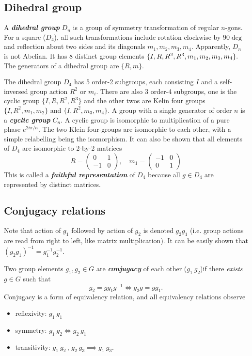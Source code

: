 \documentclass{article}
\begin{document}
\subsection{Dihedral group}
A \textit{\textbf{dihedral group}} $D_n$ is a group of symmetry transformation of regular $n$-gons. For a square ($D_4$), all such transformations include rotation clockwise by $90\deg$ and reflection about two sides and its diagonals $m_1, m_2, m_3, m_4.$ Apparently, $D_n$ is not Abelian. It has $8$ distinct group elements $\{I,R,R^{2}, R^3,  m_1, m_2, \newline m_3, m_4\}.$ The generators of a dihedral group are $\{R, m\}.$ 

The dihedral group $D_4$ has 5 order-2 subgroups, each consisting $I$ and a self-inversed group action $R^2$ or $m_i.$ There are also 3 order-4 subgroups, one is the cyclic group $\{I, R, R^2, R^3\}$ and the other twos are Kelin four groups $\{I, R^2, m_1, m_2\}$ and $\{I, R^2, m_3, m_4\}.$
A group with a single generator of order $n$ is a \textit{\textbf{cyclic group}} $C_n.$ A cyclic group is isomorphic to multiplication of a pure phase $e^{2 i \pi / n}. $ 
The two Klein four-groups are isomorphic to each other, with a simple relabelling being the isomorphism. It can also be shown that all elements of $D_4$ are isomorphic to 2-by-2 matrices 
\[
    R = \begin{pmatrix}
        0 & 1 \\
        -1 & 0
    \end{pmatrix}, \quad 
    m_1 = \begin{pmatrix}
        -1 & 0 \\
        0 & 1
    \end{pmatrix}
\]
This is called a \textit{\textbf{faithful representation}} of $D_4$ because all $g \in D_4$ are represented by distinct matrices.  

\subsection{Conjugacy relations}
Note that action of $g_1$ followed by action of $g_2$ is denoted $g_2 g_1$ (i.e. group actions are read from right to left, like matrix multiplication). It can be easily shown that $(g_2 g_1 )^{-1} = g_1^{-1} g_2^{-1}.$ 

Two group elements $g_1, g_2 \in G$ are \textit{\textbf{conjugacy}} of each other ($g_1 ~ g_2$)if there \textit{exists} $g \in G$ such that 
\[
    \boxed{g_2 = g g_1 g^{-1}} \Leftrightarrow g_2 g = g g_1.
\]
Conjugacy is a form of equivalency relation, and all equivalency relations observe
\begin{itemize}
    \item reflexivity: $g_1 ~ g_1$ 
    \item symmetry: $g_1 ~ g_2 \Leftrightarrow  g_2 ~ g_1$
    \item transitivity: $g_1 ~ g_2 \,, \, g_2 ~ g_3 \implies g_1 ~ g_3.$ 
\end{itemize}
\end{document}
